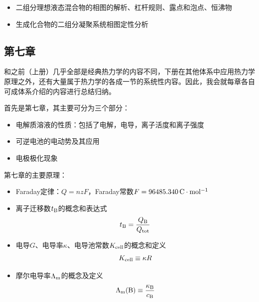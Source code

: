 \documentclass[9pt]{beamer}
\newcommand\B{{\rm B}}
\newcommand\m{{\rm m}}
\begin{document}
\begin{frame}
	\vspace*{-1em}

	\begin{itemize}
	
	\item 二组分理想液态混合物的相图的解析、杠杆规则、露点和泡点、恒沸物
	
	\item 生成化合物的二组分凝聚系统相图定性分析
	
	\end{itemize}
	
	\end{frame}
	
	\subsection{第七章}
	\begin{frame}
	
	{\color{blue}和之前（上册）几乎全部是经典热力学的内容不同，下册在其他体系中应用热力学原理之外，还有大量属于热力学的各成一节的系统性内容。因此，我会就每章各自可成体系介绍的内容进行总结归纳。}
	
	首先是第七章，其主要可分为三个部分：
	\begin{itemize}
	
	\item 电解质溶液的性质：包括了电解，电导，离子活度和离子强度
	
	\item 可逆电池的电动势及其应用

	\item 电极极化现象	
	
	\end{itemize}		
	
	第七章的主要原理：	
	\begin{itemize}
	
	\item Faraday定律：$Q=nzF$，Faraday常数$F=96485.340 \,{\rm C \cdot mol^{-1} }$
	
	\item 离子迁移数$t_\B$的概念和表达式
	\[
		t_\B = \frac{ Q_\B }{ Q_{\rm tot} }
	\]
	
	\item 电导$G$、电导率$\kappa$、电导池常数$K_{\rm cell}$的概念和定义
	\[
		K_{\rm cell} \equiv \kappa R
	\]
	
	\item 摩尔电导率$\Lambda_\m$的概念及定义
	\[
		\Lambda_\m(\B) \equiv \frac{ \kappa_\B }{ c_\B }
	\]
	
	\end{itemize}
	
	\end{frame}
	
\end{document}
